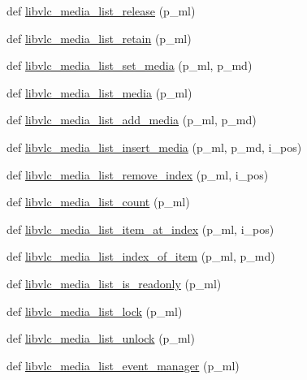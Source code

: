 \begin{DoxyCompactItemize}
\item 
def \hyperlink{namespacesrc_1_1lib_1_1vlc_a7f5f5abcfc6b2552d62867840b7641a8}{libvlc\+\_\+media\+\_\+list\+\_\+release} (p\+\_\+ml)
\item 
def \hyperlink{namespacesrc_1_1lib_1_1vlc_a633b130b2214120822cbec62568bf29e}{libvlc\+\_\+media\+\_\+list\+\_\+retain} (p\+\_\+ml)
\item 
def \hyperlink{namespacesrc_1_1lib_1_1vlc_ad7e4fb7718106abb162592433cb303a7}{libvlc\+\_\+media\+\_\+list\+\_\+set\+\_\+media} (p\+\_\+ml, p\+\_\+md)
\item 
def \hyperlink{namespacesrc_1_1lib_1_1vlc_ad529bd2a436e3ca1e45f08ffd956eb42}{libvlc\+\_\+media\+\_\+list\+\_\+media} (p\+\_\+ml)
\item 
def \hyperlink{namespacesrc_1_1lib_1_1vlc_a88e06e27116ab2bf313bf8f298240d26}{libvlc\+\_\+media\+\_\+list\+\_\+add\+\_\+media} (p\+\_\+ml, p\+\_\+md)
\item 
def \hyperlink{namespacesrc_1_1lib_1_1vlc_aabcd03b3f0ed8e10c032aa1b372124ab}{libvlc\+\_\+media\+\_\+list\+\_\+insert\+\_\+media} (p\+\_\+ml, p\+\_\+md, i\+\_\+pos)
\item 
def \hyperlink{namespacesrc_1_1lib_1_1vlc_a52fb731c2780a32c1d9a46504e6b91df}{libvlc\+\_\+media\+\_\+list\+\_\+remove\+\_\+index} (p\+\_\+ml, i\+\_\+pos)
\item 
def \hyperlink{namespacesrc_1_1lib_1_1vlc_ae15e9be9b706f1aefe295f4dec52983b}{libvlc\+\_\+media\+\_\+list\+\_\+count} (p\+\_\+ml)
\item 
def \hyperlink{namespacesrc_1_1lib_1_1vlc_a2a2921541a40d9853a9f35a57174977e}{libvlc\+\_\+media\+\_\+list\+\_\+item\+\_\+at\+\_\+index} (p\+\_\+ml, i\+\_\+pos)
\item 
def \hyperlink{namespacesrc_1_1lib_1_1vlc_a8e5fa8b2918654510f29489a344806c1}{libvlc\+\_\+media\+\_\+list\+\_\+index\+\_\+of\+\_\+item} (p\+\_\+ml, p\+\_\+md)
\item 
def \hyperlink{namespacesrc_1_1lib_1_1vlc_a6a575a810ecc47a60a02d9773f004391}{libvlc\+\_\+media\+\_\+list\+\_\+is\+\_\+readonly} (p\+\_\+ml)
\item 
def \hyperlink{namespacesrc_1_1lib_1_1vlc_ab69901b5e065bef6dcde2a89c4c707c0}{libvlc\+\_\+media\+\_\+list\+\_\+lock} (p\+\_\+ml)
\item 
def \hyperlink{namespacesrc_1_1lib_1_1vlc_ad81a197170f1561b7e75c8fe38e64e68}{libvlc\+\_\+media\+\_\+list\+\_\+unlock} (p\+\_\+ml)
\item 
def \hyperlink{namespacesrc_1_1lib_1_1vlc_a280ca6052f7f60a3a32a29de80f9dfdd}{libvlc\+\_\+media\+\_\+list\+\_\+event\+\_\+manager} (p\+\_\+ml)

\end{DoxyCompactItemize}
